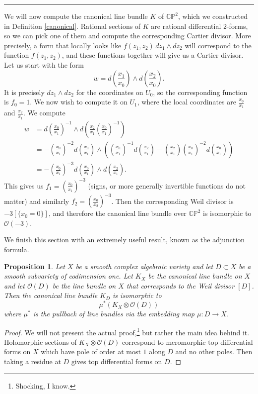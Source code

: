 \documentclass[11pt]{article}
\numberwithin{equation}{section}
\numberwithin{footnote}{section}
\newtheorem{prop}[thm]{Proposition}
\newcommand{\blue}{\color{blue}}
\renewcommand{\P}{{\mathbb P}}
\newcommand{\C}{{\mathbb C}}
\begin{document}
\smallskip
{\blue \hrule}
We will now compute the {\blue canonical} line bundle $K$ of $\C\P^2$, which we constructed in Definition \ref{canonical}.  Rational sections of $K$ are  rational differential $2$-forms, so we can pick one of them and compute the corresponding Cartier divisor. More precisely, a form that locally looks like $f(z_1,z_2) \,dz_1\wedge dz_2$ will correspond to the function $f(z_1,z_2)$, and these functions together will give us a Cartier divisor.
Let us start with the form 
$$
w = d\left(\frac {x_1}{x_0}\right) \wedge d\left(\frac {x_2}{x_0}\right).
$$
It is precisely $dz_1\wedge dz_2$ for the coordinates on $U_0$, so the corresponding function is $f_0=1$. We now wish to compute it on $U_1$, where the local coordinates are $\frac {x_0}{x_1}$ and $\frac {x_2}{x_1}$. We compute
\begin{align*}
w &= d\left(\frac {x_0}{x_1}\right)^{-1} \wedge  d\left(\frac  {x_2}{x_1} (\frac {x_0}{x_1})^{-1}\right)
\\
&=-\left( \frac {x_0}{x_1}\right)^{-2}  d\left(\frac {x_0}{x_1}\right) 
\wedge \left(\left(\frac {x_0}{x_1}\right)^{-1}d\left(\frac  {x_2}{x_1}\right) - \left(\frac  {x_2}{x_1}\right) \left( \frac {x_0}{x_1}\right)^{-2}  d\left(\frac {x_0}{x_1}\right) \right)
\\
&
=-\left( \frac {x_0}{x_1}\right)^{-3}  d\left(\frac {x_0}{x_1}\right) \wedge d\left(\frac  {x_2}{x_1}\right).
\end{align*}
This gives us $f_1=\left( \frac {x_0}{x_1}\right)^{-3}$ (signs, or more generally invertible functions do not matter) and similarly $f_2=\left(\frac {x_0}{x_2}\right)^{-3}$. Then the corresponding Weil divisor is $-3[\{x_0=0\}]$, and therefore the canonical line bundle over $\C\P^2$ is isomorphic to $\mathcal O(-3)$. 

\smallskip
We finish this section with an extremely useful result, known as the {\blue adjunction formula}.
\begin{prop}\label{adjform}
Let $X$ be a smooth complex algebraic variety and let $D\subset X$ be a smooth subvariety of codimension one. 
Let $K_X$ be the canonical line bundle on $X$ and let $\mathcal O(D)$ be the line bundle on $X$ that corresponds to the 
Weil divisor $[D]$. Then the canonical line bundle $K_D$ is isomorphic to
$$
\mu^*(K_X\otimes \mathcal O(D))
$$
where $\mu^*$ is the pullback of line bundles via the embedding map $\mu:D\to X$.
\end{prop}

\begin{proof}
We will not present the actual proof,\footnote{ Shocking, I know.}
but rather the main idea behind it. Holomorphic sections of $K_X\otimes \mathcal O(D)$ correspond to meromorphic top differential forms on $X$ which have pole of order at most $1$ along $D$ and no other poles. Then taking a residue at $D$ gives top differential forms on $D$.
\end{proof}
\end{document}
